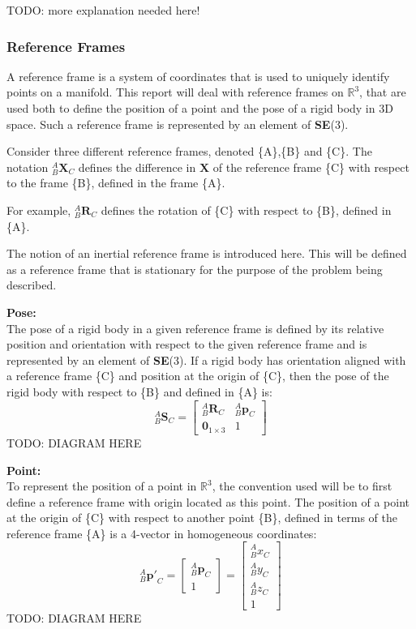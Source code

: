 		TODO: more explanation needed here!
		
	\subsubsection{Reference Frames}
		A reference frame is a system of coordinates that is used to uniquely identify points on a manifold. This report will deal with reference frames on $\mathbb{R}^3$, that are used both to define the position of a point and the pose of a rigid body in 3D space.
		Such a reference frame is represented by an element of \textbf{SE}(3).
		
		Consider three different reference frames, denoted \{A\},\{B\} and \{C\}.
		The notation $^{A}_{B}\mathbf{X}^{}_{C}$ defines the difference in $\mathbf{X}$ of the reference frame \{C\} with respect to the frame \{B\}, defined in the frame \{A\}.
		
		For example, $^{A}_{B}\mathbf{R}^{}_{C}$ defines the rotation of \{C\} with respect to \{B\}, defined in \{A\}.
		
		The notion of an inertial reference frame is introduced here. This will be defined as a reference frame that is stationary for the purpose of the problem being described. 
		
		\textbf{Pose:}\\
		The pose of a rigid body in a given reference frame is defined by its relative position and orientation with respect to the given reference frame and is represented by an element of \textbf{SE}(3). If a rigid body has orientation aligned with a reference frame \{C\} and position at the origin of \{C\}, then the pose of the rigid body with respect to \{B\} and defined in \{A\} is:
		\begin{equation}
			{^{A}_{B}\mathbf{S}^{}_{C}} = 
			\begin{bmatrix}
				^{A}_{B}\mathbf{R}^{}_{C}	& 	^{A}_{B}\mathbf{p}^{}_{C}\\
				\textbf{0}_{1 \times 3} & 1						  
			\end{bmatrix}
		\end{equation}		
		TODO: DIAGRAM HERE
		
		\textbf{Point:}\\
		To represent the position of a point in $\mathbb{R}^3$, the convention used will be to first define a reference frame with origin located as this point. The position of a point at the origin of \{C\} with respect to another point \{B\}, defined in terms of the reference frame \{A\} is a 4-vector in homogeneous coordinates:
		\begin{equation}
			{^{A}_{B}\mathbf{p'}^{}_{C}} = 
			\begin{bmatrix}
				{^{A}_{B}\mathbf{p}^{}_{C}} \\
				1
			\end{bmatrix} = 
			\begin{bmatrix}
				{^{A}_{B}x^{}_{C}} \\
				{^{A}_{B}y^{}_{C}} \\
				{^{A}_{B}z^{}_{C}} \\
				1
			\end{bmatrix}
		\end{equation}
		TODO: DIAGRAM HERE
		
